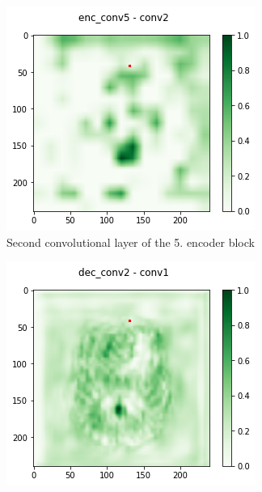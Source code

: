 \begin{figure}[H]
    \begin{subfigure}{.33\textwidth}
        \centering
        \includegraphics[width=\linewidth]{chapters/04_segmentation/images/grad_cam_17.png}
        \caption{Second convolutional layer of the 5. encoder block}
    \end{subfigure}%
    \begin{subfigure}{.33\textwidth}
        \centering
        \includegraphics[width=\linewidth]{chapters/04_segmentation/images/grad_cam_24.png}

\end{subfigure}
\end{figure}
